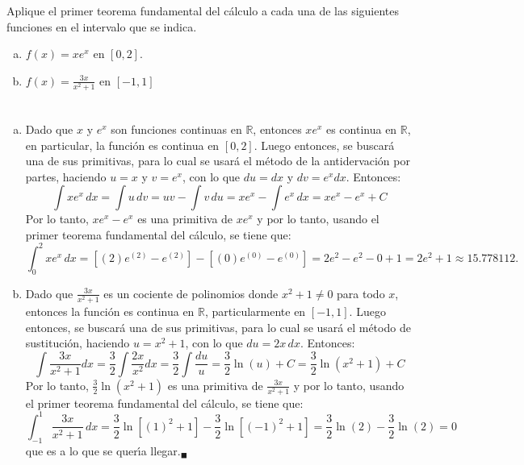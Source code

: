 \begin{enunciado}
 Aplique el primer teorema fundamental del c\'alculo a cada una de las siguientes funciones en el intervalo que se indica.
 \begin{enumerate}[(a)]
  \item $f(x) = xe^x$ en $[0,2]$.
  
  \item $f(x) = \displaystyle{ \frac{3x}{x^2 + 1} }$ en $[-1,1]$
 \end{enumerate}
\end{enunciado}

\begin{solucion}
 $\phantom{0}$
 \begin{enumerate}[(a)]
  \item Dado que $x$ y $e^x$ son funciones continuas en $\mathbb{R}$, entonces $xe^x$ es continua en $\mathbb{R}$, en particular, la funci\'on es continua en $[0,2]$. Luego entonces, se buscar\'a una de sus primitivas, para lo cual se usar\'a el m\'etodo de la antidervaci\'on por partes, haciendo $u = x$ y $v = e^x$, con lo que $du = dx$ y $dv = e^x dx$. Entonces:
  \begin{equation*}
   \int xe^x \, dx = \int u\,dv = uv - \int v\,du = xe^x - \int e^x \, dx = xe^x - e^x + C
  \end{equation*}
  Por lo tanto, $xe^x - e^x$ es una primitiva de $xe^x$ y por lo tanto, usando el primer teorema fundamental del c\'alculo, se tiene que:
  \begin{equation*}
   \int_{0}^{2} xe^x \, dx = \left[ (2)e^{(2)} - e^{(2)} \right] - \left[ (0)e^{(0)} - e^{(0)} \right] = 2e^2 - e^2 - 0 + 1 = 2e^2 + 1 \approx 15.778112.
  \end{equation*}

  \item Dado que $\frac{3x}{x^2 + 1}$ es un cociente de polinomios donde $x^2 + 1 \neq 0$ para todo $x$, entonces la funci\'on es continua en $\mathbb{R}$, particularmente en $[-1,1]$. Luego entonces, se buscar\'a una de sus primitivas, para lo cual se usar\'a el m\'etodo de sustituci\'on, haciendo $u = x^2 + 1$, con lo que $du = 2x \, dx$. Entonces:
  \begin{equation*}
   \int \frac{3x}{x^2 + 1} dx = \frac{3}{2} \int \frac{2x}{x^2} dx = \frac{3}{2} \int \frac{du}{u} = \frac{3}{2} \ln(u) + C = \frac{3}{2} \ln(x^2 + 1) + C
  \end{equation*}
  Por lo tanto, $\frac{3}{2} \ln\left(x^2 + 1\right)$ es una primitiva de $\frac{3x}{x^2 + 1}$ y por lo tanto, usando el primer teorema fundamental del c\'alculo, se tiene que:
  \begin{equation*}
   \int_{-1}^{1} \frac{3x}{x^2+1}\, dx = \frac{3}{2}\ln\left[ (1)^2 + 1 \right] - \frac{3}{2}\ln\left[ (-1)^2 + 1 \right] = \frac{3}{2}\ln(2) - \frac{3}{2}\ln(2) = 0
  \end{equation*}
  que es a lo que se quer\'{\i}a llegar.${}_{\blacksquare}$
 \end{enumerate}
\end{solucion}
